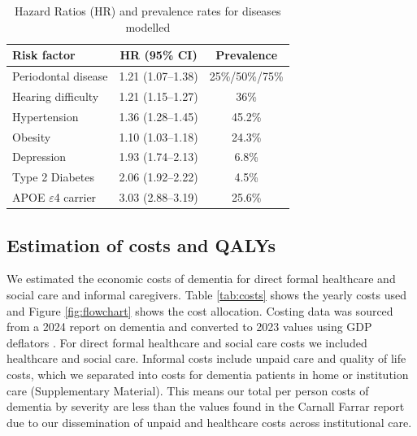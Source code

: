 \documentclass[11pt,a4paper]{article}
\begin{document}
\begin{table}[htbp]
\centering
\caption{Hazard Ratios (HR) and prevalence rates for diseases modelled}
\label{tab:risk_factors}
\begin{tabular}{lcc}
\toprule
\textbf{Risk factor} & \textbf{HR (95\% CI)} & \textbf{Prevalence} \\
\midrule
Periodontal disease & 1.21 (1.07--1.38) & 25\%/50\%/75\% \\
Hearing difficulty & 1.21 (1.15--1.27) & 36\% \\
Hypertension & 1.36 (1.28--1.45) & 45.2\% \\
Obesity & 1.10 (1.03--1.18) & 24.3\% \\
Depression & 1.93 (1.74--2.13) & 6.8\% \\
Type 2 Diabetes & 2.06 (1.92--2.22) & 4.5\% \\
APOE $\varepsilon$4 carrier & 3.03 (2.88--3.19) & 25.6\% \\
\bottomrule
\end{tabular}
\end{table}

\subsection{Estimation of costs and QALYs}

We estimated the economic costs of dementia for direct formal healthcare and social care and informal caregivers. Table \ref{tab:costs} shows the yearly costs used and Figure \ref{fig:flowchart} shows the cost allocation. Costing data was sourced from a 2024 report on dementia and converted to 2023 values using GDP deflators \cite{ref34,ref35}. For direct formal healthcare and social care costs we included healthcare and social care. Informal costs include unpaid care and quality of life costs, which we separated into costs for dementia patients in home or institution care (Supplementary Material). This means our total per person costs of dementia by severity are less than the values found in the Carnall Farrar report due to our dissemination of unpaid and healthcare costs across institutional care.
\end{document}
